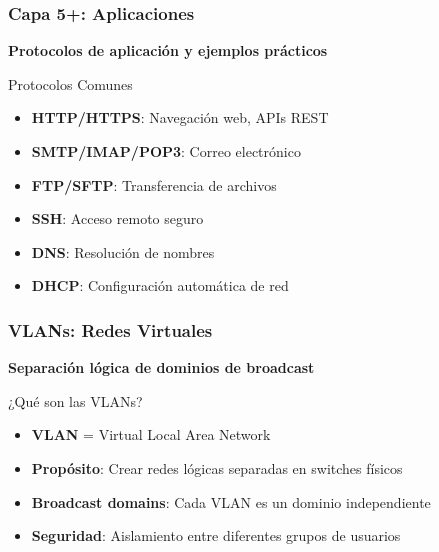 \documentclass[aspectratio=169]{beamer}
\begin{document}
            \begin{frame}
            \frametitle{Capa 5+: Aplicaciones}
            
            \begin{center}
            \Large \textbf{Protocolos de aplicación y ejemplos prácticos}
            \end{center}
            
            \begin{block}{Protocolos Comunes}
            \begin{itemize}
            \item \textbf{HTTP/HTTPS}: Navegación web, APIs REST
            \item \textbf{SMTP/IMAP/POP3}: Correo electrónico
            \item \textbf{FTP/SFTP}: Transferencia de archivos
            \item \textbf{SSH}: Acceso remoto seguro
            \item \textbf{DNS}: Resolución de nombres
            \item \textbf{DHCP}: Configuración automática de red
            \end{itemize}
            \end{block}
            
            \end{frame}
            
            \begin{frame}
            \frametitle{VLANs: Redes Virtuales}
            \begin{center}
            \Large \textbf{Separación lógica de dominios de broadcast}
            \end{center}            
            \begin{block}{¿Qué son las VLANs?}
            \begin{itemize}
            \item \textbf{VLAN} = Virtual Local Area Network
            \item \textbf{Propósito}: Crear redes lógicas separadas en switches físicos
            \item \textbf{Broadcast domains}: Cada VLAN es un dominio independiente
            \item \textbf{Seguridad}: Aislamiento entre diferentes grupos de usuarios
            \end{itemize}
            \end{block}
                    
          \end{frame}  
            
\end{document}
